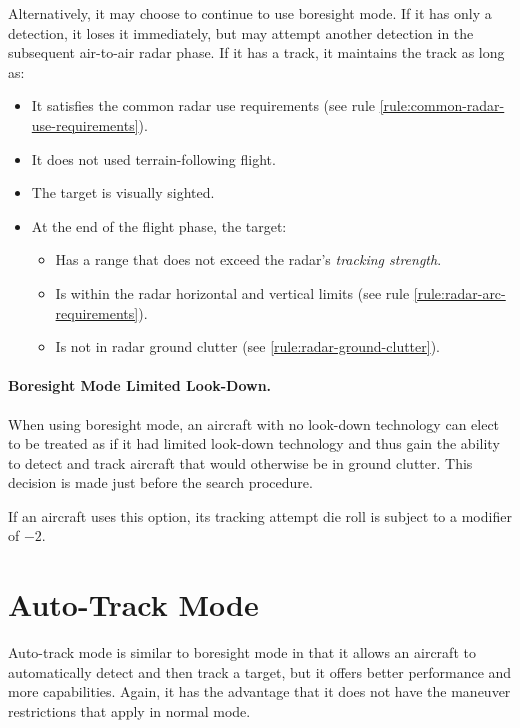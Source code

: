 {\begin{advancedrules}
Alternatively, it may choose to continue to use boresight mode. If it has only a detection, it loses it immediately, but may attempt another detection in the subsequent air-to-air radar phase. If it has a track, it maintains the track as long as:
\begin{itemize}
    \item It satisfies the common radar use requirements (see rule \ref{rule:common-radar-use-requirements}).
    \item It does not used terrain-following flight.
    \item The target is visually sighted.
    \item At the end of the flight phase, the target:
    \begin{itemize}
        \item Has a range that does not exceed the radar's \emph{tracking strength}.
        \item Is within the radar horizontal and vertical limits (see rule \ref{rule:radar-arc-requirements}).
        \item Is not in radar ground clutter (see  \ref{rule:radar-ground-clutter}).
    \end{itemize}
\end{itemize}

\paragraph{Boresight Mode Limited Look-Down.}

When using boresight mode, an aircraft with no look-down technology can elect to be treated as if it had limited look-down technology and thus gain the ability to detect and track aircraft that would otherwise be in ground clutter. This decision is made just before the search procedure. 

If an aircraft uses this option, its tracking attempt die roll is subject to a modifier of $-2$. 

\section{Auto-Track Mode}
\label{rule:auto-track-mode} 

Auto-track mode is similar to boresight mode in that it allows an aircraft to automatically detect and then track a target, but it offers better performance and more capabilities. Again, it has the advantage that it does not have the maneuver restrictions that apply in normal mode.


\end{advancedrules}}
